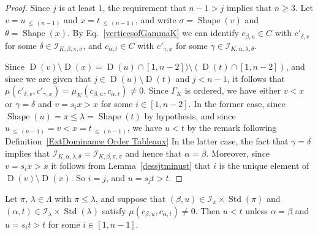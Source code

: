 \documentclass[ALCO,ThmDefs,Unicode,epreuves]{cedram}
\newcommand{\Lessthan}[2]{#1\,{_{\leqslant\,#2}}}
\DeclareMathOperator{\STD}{Std}
\DeclareMathOperator{\shape}{Shape}
\DeclareMathOperator{\D}{D}
\begin{document}
\begin{proof}
Since $j$ is at least $1$, the requirement that $n-1>j$ implies that $n\geqslant 3$.
Let $v=\Lessthan u{(n-1)}$ and $x=\Lessthan t{(n-1)}$, and write
$\sigma=\shape(v)$ and $\theta=\shape(x)$. By Eq.~\eqref{verticesofGammaK} we can
identify $c_{\beta,u}\in C$ with
$c'_{\delta,v}$ for some $\delta\in\mathcal{I}_{K,\beta,\pi,\sigma}$, and
$c_{\alpha,t}\in C$ with $c'_{\gamma,x}$ for some
$\gamma\in\mathcal{I}_{K,\alpha,\lambda,\theta}$.

Since $\D(v)\setminus\D(x)=\D(u)\cap[1,n-2])\setminus(\D(t)\cap[1,n-2])$, and since we are
given that $j\in\D(u)\setminus\D(t)$ and $j<n-1$,
it follows that
$\mu(c'_{\delta,v},c'_{\gamma,x})=\mu_K(c_{\beta,u},c_{\alpha,t})\neq 0$.
Since $\Gamma_K$ is ordered, we have either $v<x$ or $\gamma=\delta$ and
$v=s_ix>x$ for some $i\in[1,n-2]$. In the former case, since
$\shape(u)=\pi\leqslant\lambda=\shape(t)$ by hypothesis, and
since $\Lessthan u{(n-1)}=v<x=\Lessthan t{(n-1)}$,
we have $u<t$ by the remark following Definition~\ref{ExtDominance Order Tableaux}
In the latter case, the fact that $\gamma=\delta$ implies that
$\mathcal{I}_{K,\alpha,\lambda,\theta}=\mathcal{I}_{K,\beta,\pi,\sigma}$
and hence that $\alpha=\beta$. Moreover, since $v=s_ix>x$ it follows
from Lemma~\ref{dessjtminust} that $i$ is the unique element of
$\D(v)\setminus\D(x)$. So $i=j$, and $u=s_jt>t$.
\end{proof}

\begin{prop}\label{kldominancesamenolecule}
Let $\pi,\,\lambda\in\Lambda$ with $\pi\leqslant\lambda$, and
suppose that $(\beta,u)\in\mathcal{I}_{\pi}\times\STD(\pi)$ and
$(\alpha,t)\in\mathcal{I}_{\lambda}\times\STD(\lambda)$ satisfy
$\mu(c_{\beta,u},c_{\alpha,t}) \neq 0$. Then $u < t$ unless
$\alpha = \beta$ and $u=s_i t>t$ for some $i\in[1,n-1]$.
\end{prop}
\end{document}

